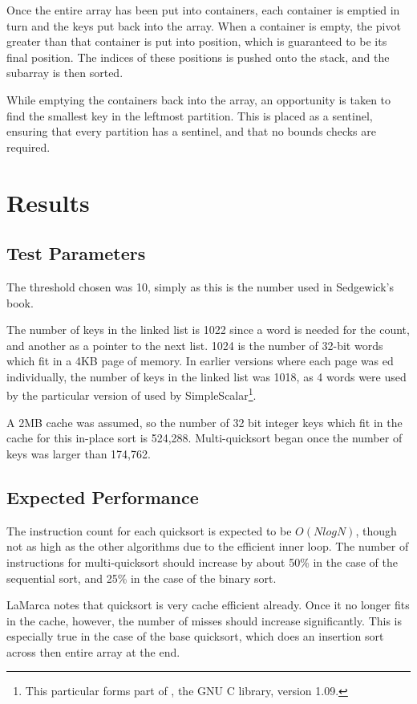 Once the entire array has been put into containers, each container is emptied
in turn and the keys put back into the array. When a container is empty, the
pivot greater than that container is put into position, which is guaranteed to
be its final position.  The indices of these positions is pushed onto the
stack, and the subarray is then sorted.

While emptying the containers back into the array, an opportunity is taken to
find the smallest key in the leftmost partition. This is placed as a sentinel,
ensuring that every partition has a sentinel, and that no bounds checks are
required.

\section{Results}

\subsection{Test Parameters}

The threshold chosen was 10, simply as this is the number used in Sedgewick's
book.

The number of keys in the linked list is 1022 since a word is needed for the
count, and another as a pointer to the next list. 1024 is the number of 32-bit
words which fit in a 4KB page of memory. In earlier versions where each page was
ed individually, the number of keys in the linked list was 1018,
as 4 words were used by the particular version of  used by
SimpleScalar\footnote{This particular  forms part of
, the GNU C library, version 1.09.}.

A 2MB cache was assumed, so the number of 32 bit integer keys which fit in the
cache for this in-place sort is 524,288. Multi-quicksort began once the number
of keys was larger than 174,762.

\subsection{Expected Performance}

The instruction count for each quicksort is expected to be $O(NlogN)$, though
not as high as the other algorithms due to the efficient inner loop.  The number
of instructions for multi-quicksort should increase by about 50\% in the case of
the sequential sort, and 25\% in the case of the binary sort.

LaMarca notes that quicksort is very cache efficient already. Once it no longer
fits in the cache, however, the number of misses should increase significantly.
This is especially true in the case of the base quicksort, which does an
insertion sort across then entire array at the end.

